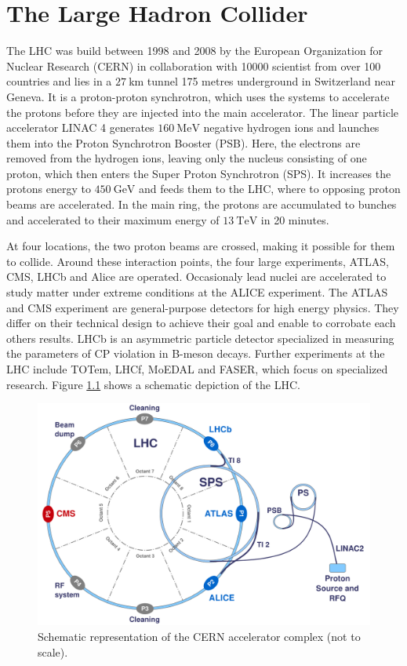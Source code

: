 \chapter{The Large Hadron Collider}
The LHC was build between 1998 and 2008 by the European Organization for Nuclear Research (CERN) in collaboration with 10000 scientist from over 100 countries
and lies in a $\SI{27}{\kilo\meter}$ tunnel 175 metres underground in Switzerland near Geneva. It is a proton-proton synchrotron, which uses
the systems to accelerate the protons before they are injected into the main accelerator. The linear particle accelerator LINAC 4 generates $\SI{160}{\mega\eV}$
negative hydrogen ions and launches them into the Proton Synchrotron Booster (PSB). Here, the electrons are removed from the hydrogen ions, leaving only the nucleus
consisting of one proton, which then enters the Super Proton Synchrotron (SPS). It increases the protons energy to $\SI{450}{\GeV}$ and feeds them to the
LHC, where to opposing proton beams are accelerated. In the main ring,
the protons are accumulated to bunches and accelerated to their maximum energy of $\SI{13}{\tera\eV}$ in 20 minutes.

At four locations, the two proton beams
are crossed, making it possible for them to collide. Around these interaction points, the four large experiments, ATLAS, CMS, LHCb and Alice are operated.
Occasionaly lead nuclei are accelerated to study matter under extreme conditions at the ALICE experiment. The ATLAS and CMS experiment are general-purpose detectors for
high energy physics. They differ on their technical design to achieve their goal and enable to corrobate each others results.
LHCb is an asymmetric particle detector specialized in measuring the parameters of CP violation in B-meson decays.
Further experiments at the LHC include TOTem, LHCf, MoEDAL and FASER, which focus on specialized research. Figure \ref{fig:lhc_aufbau} shows a schematic depiction
of the LHC.

\begin{figure}[H]
  \centering
  \includegraphics[height=0.4\textwidth]{images/lhc_aufbau.png}
  \caption{Schematic representation of the CERN accelerator complex (not to scale)\cite{lhc_aufbau}.}
  \label{fig:lhc_aufbau}
\end{figure}

